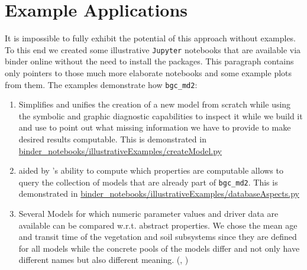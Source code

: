 \section{Example Applications}  
\label{sec:ExampleApplications}
It is impossible to fully exhibit the potential of this approach without
examples.
To this end we created some illustrative \texttt{Jupyter} notebooks that are
available via binder online without the need to install the packages. 
This paragraph contains only pointers to those much more elaborate notebooks
and some example plots from them.
The examples demonstrate how \texttt{bgc_md2}:
\begin{enumerate}
\item 
  Simplifies and unifies the creation of a new model from scratch while using the
  symbolic and graphic diagnostic capabilities to inspect it while we build it
  and use 
  \ComputabilityGraphs to point out what missing information we have to
  provide to make desired results computable.
  This is demonstrated in
    \href{https://github.com/MPIBGC-TEE/bgc_md2/blob/binder/binder_notebooks/illustrativeExamples/createModel.py}{binder_notebooks/illustrativeExamples/createModel.py}
    
\item 
  aided by \ComputabilityGraphs 's ability to compute which properties are computable
  allows to query the collection of models that are already part of
  \texttt{bgc\_md2}.
  This is demonstrated in
    \href{https://github.com/MPIBGC-TEE/bgc_md2/blob/binder/binder_notebooks/illustrativeExamples/databaseAspects.py}{binder_notebooks/illustrativeExamples/databaseAspects.py}
\item 
  \label{enum:trendy}
  Several Models for which numeric parameter values and driver data are
  available can be compared w.r.t. abstract properties.
  We chose the mean age and transit time of the vegetation and soil subsystems
  since they are defined for all models while the concrete pools of the models
  differ and not only have different names but also different meaning.
  (,  )
\end{enumerate}

